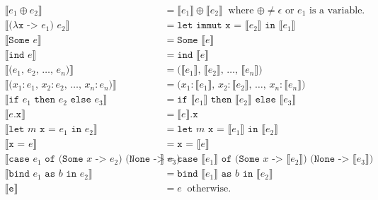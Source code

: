 \documentclass{article}
\newcommand{\intI}[1]{\llbracket\texttt{#1}\rrbracket}
\begin{document}
    \begin{align}
        \intI{$e_1 \oplus e_2$}
            &= \intI{$e_1$} \oplus \intI{$e_2$} \;\; \text{where $\oplus \neq \epsilon$ or $e_1$ is a variable.} \\
        \intI{($\lambda$x -> $e_1$) $e_2$}
            &= \texttt{let immut x = $\intI{$e_2$}$ in $\intI{$e_1$}$} \\
        \intI{Some $e$}
            &= \texttt{Some $\intI{$e$}$} \\
        \intI{ind $e$}
            &= \texttt{ind $\intI{$e$}$} \\
        \intI{($e_1$, $e_2$, \ldots, $e_n$)}
            &= \texttt{($\intI{$e_1$}$, $\intI{$e_2$}$, \ldots, $\intI{$e_n$}$)} \\
        \intI{($x_1: e_1$, $x_2: e_2$, \ldots, $x_n: e_n$)}
            &= \texttt{($x_1: \intI{$e_1$}$, $x_2: \intI{$e_2$}$, \ldots, $x_n: \intI{$e_n$}$)} \\
        \intI{if $e_1$ then $e_2$ else $e_3$}
            &= \texttt{if $\intI{$e_1$}$ then $\intI{$e_2$}$ else $\intI{$e_3$}$} \\
        \intI{$e$.x}
            &= \texttt{$\intI{$e$}$.x} \\
        \intI{let $m$ x = $e_1$ in $e_2$}
            &= \texttt{let $m$ x = $\intI{$e_1$}$ in $\intI{$e_2$}$} \\
        \intI{x = $e$}
            &= \texttt{x = $\intI{$e$}$} \\
        \intI{case $e_1$ of (Some $x$ -> $e_2$) (None -> $e_3$)}
            &= \texttt{case $\intI{$e_1$}$ of (Some $x$ -> $\intI{$e_2$}$) (None -> $\intI{$e_3$}$)} \\
        \intI{bind $e_1$ as $b$ in $e_2$}
            &= \texttt{bind $\intI{$e_1$}$ as $b$ in $\intI{$e_2$}$} \\
        \intI{e}
            &= e \;\; \text{otherwise.}
    \end{align}
\end{document}
